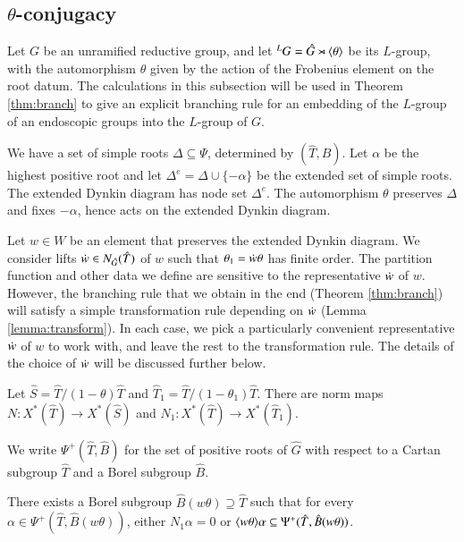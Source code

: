 \subsection{$\theta$-conjugacy}\label{sec:theta-conj}

Let $G$ be an unramified reductive group, and let ${}^LG = \hat G
\rtimes \langle{\theta}\rangle$ be its $L$-group, with the automorphism $\theta$
given by the action of the Frobenius element on the root datum.  
The calculations in this subsection will be used in Theorem
\ref{thm:branch} to give an explicit branching rule for an embedding of
the $L$-group of an endoscopic groups into the $L$-group of $G$.

We have a set of simple roots $\Delta\subseteq \Psi$, determined by
$(\hat T,\hat B)$.  Let $\alpha$ be the highest positive root and let
$\Delta^e = \Delta \cup \{-\alpha\}$ be the extended set of simple
roots.  The extended Dynkin diagram has node set $\Delta^e$.  The
automorphism $\theta$ preserves $\Delta$ and fixes $-\alpha$, hence
acts on the extended Dynkin diagram.

Let $w\in W$ be an element that preserves the extended Dynkin diagram.
We consider lifts $\dot w\in N_{\hat G}(\hat T)$ of $w$ such that
$\theta_1 = \dot w \theta$ has finite order.  The partition function
and other data we define are sensitive to the
representative $\dot w$ of $w$.  However, the branching rule that we
obtain in the end (Theorem \ref{thm:branch}) will satisfy a simple
transformation rule depending on $\dot w$ (Lemma
\ref{lemma:transform}).  In each case, we pick a particularly
convenient representative $\dot w$ of $w$ to work with, and leave the
rest to the transformation rule.  The details of the choice of $\dot w$
will be discussed further below.

Let $\hat S = \hat T/(1-\theta)\hat T$ and $\hat T_1 = \hat
T/(1-\theta_1)\hat T$.  There are norm maps $N:X^*(\hat T)\to X^*(\hat
S)$ and $N_1:X^*(\hat T)\to X^*(\hat T_1)$.  


We write $\Psi^+(\hat T,\hat B)$ for the set of positive roots of
$\hat G$ with respect to a Cartan subgroup $\hat T$ and a Borel subgroup
$\hat B$.

\begin{lemma}\label{lemma:adapted}
  There exists a Borel subgroup $\hat
  B(w\theta)\supseteq \hat T$ such that for every
  $\alpha\in\Psi^+(\hat T,\hat B(w\theta))$, either $N_1\alpha = 0$
  or $\langle{w\theta}\rangle\alpha\subseteq \Psi^+(\hat T,\hat B(w\theta))$.
\end{lemma}

